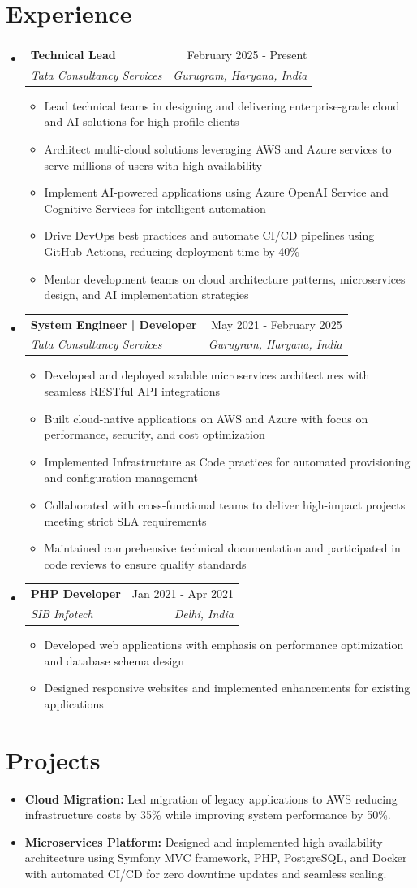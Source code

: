 \documentclass[letterpaper,11pt]{article}
\makeatletter
\newcommand{\resumeItem}[1]{
  \item\small{
    {#1 \vspace{-2pt}}
  }
}
\newcommand{\resumeSubheading}[4]{
  \vspace{-1pt}\item
    \begin{tabular*}{0.97\textwidth}[t]{l@{\extracolsep{\fill}}r}
      \textbf{#1} & #2 \\
      \textit{\small#3} & \textit{\small #4} \\
    \end{tabular*}\vspace{-5pt}
}
\newcommand{\resumeSubHeadingListStart}{\begin{itemize}[leftmargin=0.15in, label={}]}
\newcommand{\resumeSubHeadingListEnd}{\end{itemize}}
\newcommand{\resumeItemListStart}{\begin{itemize}}
\newcommand{\resumeItemListEnd}{\end{itemize}\vspace{-5pt}}
\makeatother
\begin{document}
\section{Experience}
  \resumeSubHeadingListStart

    \resumeSubheading
      {Technical Lead}{February 2025 - Present}
      {Tata Consultancy Services}{Gurugram, Haryana, India}
      \resumeItemListStart
        \resumeItem{Lead technical teams in designing and delivering enterprise-grade cloud and AI solutions for high-profile clients}
        \resumeItem{Architect multi-cloud solutions leveraging AWS and Azure services to serve millions of users with high availability}
        \resumeItem{Implement AI-powered applications using Azure OpenAI Service and Cognitive Services for intelligent automation}
        \resumeItem{Drive DevOps best practices and automate CI/CD pipelines using GitHub Actions, reducing deployment time by 40\%}
        \resumeItem{Mentor development teams on cloud architecture patterns, microservices design, and AI implementation strategies}
      \resumeItemListEnd

    \resumeSubheading
      {System Engineer | Developer}{May 2021 - February 2025}
      {Tata Consultancy Services}{Gurugram, Haryana, India}
      \resumeItemListStart
        \resumeItem{Developed and deployed scalable microservices architectures with seamless RESTful API integrations}
        \resumeItem{Built cloud-native applications on AWS and Azure with focus on performance, security, and cost optimization}
        \resumeItem{Implemented Infrastructure as Code practices for automated provisioning and configuration management}
        \resumeItem{Collaborated with cross-functional teams to deliver high-impact projects meeting strict SLA requirements}
        \resumeItem{Maintained comprehensive technical documentation and participated in code reviews to ensure quality standards}
      \resumeItemListEnd

    \resumeSubheading
      {PHP Developer}{Jan 2021 - Apr 2021}
      {SIB Infotech}{Delhi, India}
      \resumeItemListStart
        \resumeItem{Developed web applications with emphasis on performance optimization and database schema design}
        \resumeItem{Designed responsive websites and implemented enhancements for existing applications}
      \resumeItemListEnd

  \resumeSubHeadingListEnd


\section{Projects}
   \resumeSubHeadingListStart
      \resumeItem{\textbf{Cloud Migration:} Led migration of legacy applications to AWS reducing infrastructure costs by 35\% while improving system performance by 50\%.}
      \resumeItem{\textbf{Microservices Platform:} Designed and implemented high availability architecture using Symfony MVC framework, PHP, PostgreSQL, and Docker with automated CI/CD for zero downtime updates and seamless scaling.}
    \resumeSubHeadingListEnd
\end{document}
